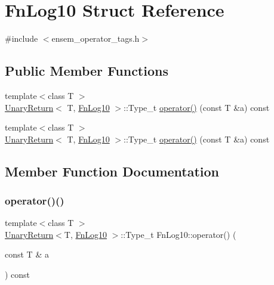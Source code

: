 \hypertarget{structFnLog10}{}\section{Fn\+Log10 Struct Reference}
\label{structFnLog10}


{\ttfamily \#include $<$ensem\+\_\+operator\+\_\+tags.\+h$>$}

\subsection*{Public Member Functions}
\begin{DoxyCompactItemize}
\item 
{\footnotesize template$<$class T $>$ }\\\mbox{\hyperlink{structUnaryReturn}{Unary\+Return}}$<$ T, \mbox{\hyperlink{structFnLog10}{Fn\+Log10}} $>$\+::Type\+\_\+t \mbox{\hyperlink{structFnLog10_a1548f8a24a8e8897062608f1825e0c11}{operator()}} (const T \&a) const
\item 
{\footnotesize template$<$class T $>$ }\\\mbox{\hyperlink{structUnaryReturn}{Unary\+Return}}$<$ T, \mbox{\hyperlink{structFnLog10}{Fn\+Log10}} $>$\+::Type\+\_\+t \mbox{\hyperlink{structFnLog10_a1548f8a24a8e8897062608f1825e0c11}{operator()}} (const T \&a) const
\end{DoxyCompactItemize}


\subsection{Member Function Documentation}
\mbox{\label{structFnLog10_a1548f8a24a8e8897062608f1825e0c11}} 
\subsubsection{\texorpdfstring{operator()()}{operator()()}\hspace{0.1cm}{\footnotesize\ttfamily [1/2]}}
{\footnotesize\ttfamily template$<$class T $>$ \\
\mbox{\hyperlink{structUnaryReturn}{Unary\+Return}}$<$T, \mbox{\hyperlink{structFnLog10}{Fn\+Log10}} $>$\+::Type\+\_\+t Fn\+Log10\+::operator() (\begin{DoxyParamCaption}\item[{const T \&}]{a }\end{DoxyParamCaption}) const\hspace{0.3cm}{\ttfamily [inline]}}

